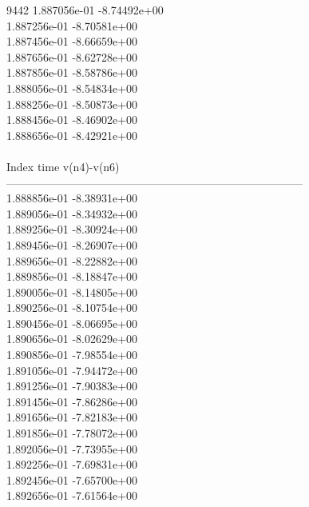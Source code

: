 9442	1.887056e-01	-8.74492e+00	\\ 	1.887256e-01	-8.70581e+00	\\ 	1.887456e-01	-8.66659e+00	\\ 	1.887656e-01	-8.62728e+00	\\ 	1.887856e-01	-8.58786e+00	\\ 	1.888056e-01	-8.54834e+00	\\ 	1.888256e-01	-8.50873e+00	\\ 	1.888456e-01	-8.46902e+00	\\ 	1.888656e-01	-8.42921e+00	\\ \hline
\\ \hline
Index   time            v(n4)-v(n6)     \\ \hline
--------------------------------------------------------------------------------\\ 	1.888856e-01	-8.38931e+00	\\ 	1.889056e-01	-8.34932e+00	\\ 	1.889256e-01	-8.30924e+00	\\ 	1.889456e-01	-8.26907e+00	\\ 	1.889656e-01	-8.22882e+00	\\ 	1.889856e-01	-8.18847e+00	\\ 	1.890056e-01	-8.14805e+00	\\ 	1.890256e-01	-8.10754e+00	\\ 	1.890456e-01	-8.06695e+00	\\ 	1.890656e-01	-8.02629e+00	\\ 	1.890856e-01	-7.98554e+00	\\ 	1.891056e-01	-7.94472e+00	\\ 	1.891256e-01	-7.90383e+00	\\ 	1.891456e-01	-7.86286e+00	\\ 	1.891656e-01	-7.82183e+00	\\ 	1.891856e-01	-7.78072e+00	\\ 	1.892056e-01	-7.73955e+00	\\ 	1.892256e-01	-7.69831e+00	\\ 	1.892456e-01	-7.65700e+00	\\ 	1.892656e-01	-7.61564e+00	\\ \hline
